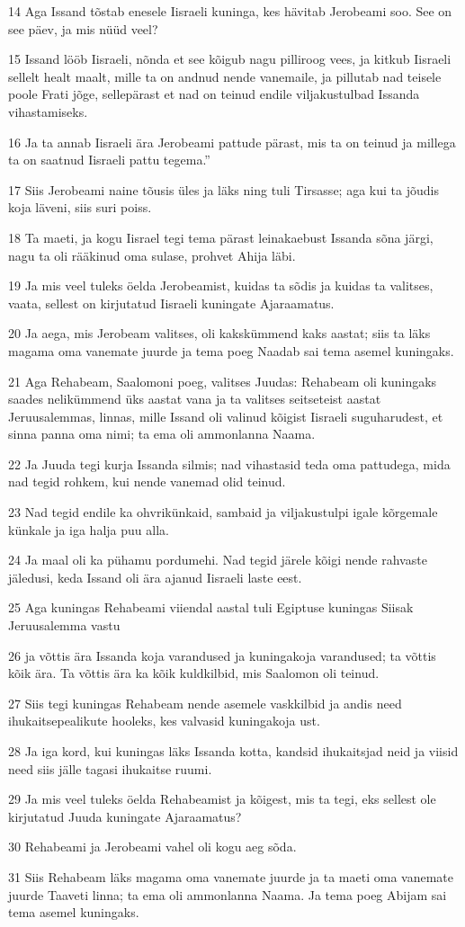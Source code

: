\par 14 Aga Issand tõstab enesele Iisraeli kuninga, kes hävitab Jerobeami soo. See on see päev, ja mis nüüd veel?
\par 15 Issand lööb Iisraeli, nõnda et see kõigub nagu pilliroog vees, ja kitkub Iisraeli sellelt healt maalt, mille ta on andnud nende vanemaile, ja pillutab nad teisele poole Frati jõge, sellepärast et nad on teinud endile viljakustulbad Issanda vihastamiseks.
\par 16 Ja ta annab Iisraeli ära Jerobeami pattude pärast, mis ta on teinud ja millega ta on saatnud Iisraeli pattu tegema.”
\par 17 Siis Jerobeami naine tõusis üles ja läks ning tuli Tirsasse; aga kui ta jõudis koja läveni, siis suri poiss.
\par 18 Ta maeti, ja kogu Iisrael tegi tema pärast leinakaebust Issanda sõna järgi, nagu ta oli rääkinud oma sulase, prohvet Ahija läbi.
\par 19 Ja mis veel tuleks öelda Jerobeamist, kuidas ta sõdis ja kuidas ta valitses, vaata, sellest on kirjutatud Iisraeli kuningate Ajaraamatus.
\par 20 Ja aega, mis Jerobeam valitses, oli kakskümmend kaks aastat; siis ta läks magama oma vanemate juurde ja tema poeg Naadab sai tema asemel kuningaks.
\par 21 Aga Rehabeam, Saalomoni poeg, valitses Juudas: Rehabeam oli kuningaks saades nelikümmend üks aastat vana ja ta valitses seitseteist aastat Jeruusalemmas, linnas, mille Issand oli valinud kõigist Iisraeli suguharudest, et sinna panna oma nimi; ta ema oli ammonlanna Naama.
\par 22 Ja Juuda tegi kurja Issanda silmis; nad vihastasid teda oma pattudega, mida nad tegid rohkem, kui nende vanemad olid teinud.
\par 23 Nad tegid endile ka ohvrikünkaid, sambaid ja viljakustulpi igale kõrgemale künkale ja iga halja puu alla.
\par 24 Ja maal oli ka pühamu pordumehi. Nad tegid järele kõigi nende rahvaste jäledusi, keda Issand oli ära ajanud Iisraeli laste eest.
\par 25 Aga kuningas Rehabeami viiendal aastal tuli Egiptuse kuningas Siisak Jeruusalemma vastu
\par 26 ja võttis ära Issanda koja varandused ja kuningakoja varandused; ta võttis kõik ära. Ta võttis ära ka kõik kuldkilbid, mis Saalomon oli teinud.
\par 27 Siis tegi kuningas Rehabeam nende asemele vaskkilbid ja andis need ihukaitsepealikute hooleks, kes valvasid kuningakoja ust.
\par 28 Ja iga kord, kui kuningas läks Issanda kotta, kandsid ihukaitsjad neid ja viisid need siis jälle tagasi ihukaitse ruumi.
\par 29 Ja mis veel tuleks öelda Rehabeamist ja kõigest, mis ta tegi, eks sellest ole kirjutatud Juuda kuningate Ajaraamatus?
\par 30 Rehabeami ja Jerobeami vahel oli kogu aeg sõda.
\par 31 Siis Rehabeam läks magama oma vanemate juurde ja ta maeti oma vanemate juurde Taaveti linna; ta ema oli ammonlanna Naama. Ja tema poeg Abijam sai tema asemel kuningaks.

